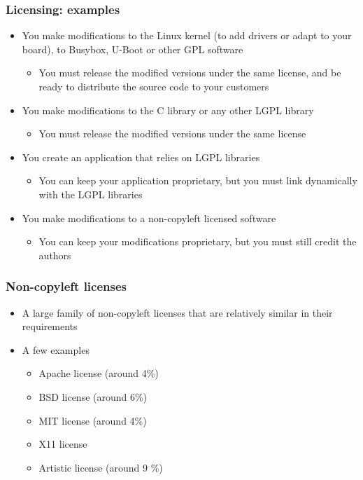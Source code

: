\begin{frame}
  \frametitle{Licensing: examples}
  \begin{itemize}
  \item You make modifications to the Linux kernel (to add drivers or
    adapt to your board), to Busybox, U-Boot or other GPL software
    \begin{itemize}
    \item You must release the modified versions under the same
      license, and be ready to distribute the source code to your
      customers
    \end{itemize}
  \item You make modifications to the C library or any other LGPL
    library
    \begin{itemize}
    \item You must release the modified versions under the same
      license
    \end{itemize}
  \item You create an application that relies on LGPL libraries
    \begin{itemize}
    \item You can keep your application proprietary, but you must link
      dynamically with the LGPL libraries
    \end{itemize}
  \item You make modifications to a non-copyleft licensed software
    \begin{itemize}
    \item You can keep your modifications proprietary, but you must
      still credit the authors
    \end{itemize}
  \end{itemize}
\end{frame}

\begin{frame}
  \frametitle{Non-copyleft licenses}
  \begin{itemize}
  \item A large family of non-copyleft licenses that are relatively
    similar in their requirements
  \item A few examples
    \begin{itemize}
    \item Apache license (around 4\%)
    \item BSD license (around 6\%)
    \item MIT license (around 4\%)
    \item X11 license
    \item Artistic license (around 9 \%)
    \end{itemize}
  \end{itemize}
\end{frame}

